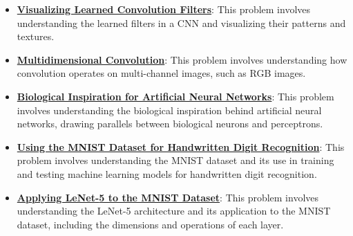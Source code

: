 \documentclass{article}%
\begin{document}
\begin{itemize}[leftmargin=*]
\item \href{https://purdue.brightspace.com/d2l/common/assets/pdfjs-d2l-dist/1.0.14-legacy/web/viewer.html?file=\%2Fcontent\%2Fenforced\%2F1095467-wl.202510.CS.24300.001\%2F09L1-cnn.pdf\%3Fou\%3D1095467\&lang=en-us\&container=d2l-fileviewer-rendered-pdf\&fullscreen=d2l-fileviewer-rendered-pdf-dialog\&height=667#page=18}{\textbf{Visualizing Learned Convolution Filters}}: This problem involves understanding the learned filters in a CNN and visualizing their patterns and textures.%
\item \href{https://purdue.brightspace.com/d2l/common/assets/pdfjs-d2l-dist/1.0.14-legacy/web/viewer.html?file=\%2Fcontent\%2Fenforced\%2F1095467-wl.202510.CS.24300.001\%2F09L1-cnn.pdf\%3Fou\%3D1095467\&lang=en-us\&container=d2l-fileviewer-rendered-pdf\&fullscreen=d2l-fileviewer-rendered-pdf-dialog\&height=667#page=19}{\textbf{Multidimensional Convolution}}: This problem involves understanding how convolution operates on multi-channel images, such as RGB images.%
\item \href{https://purdue.brightspace.com/d2l/common/assets/pdfjs-d2l-dist/1.0.14-legacy/web/viewer.html?file=\%2Fcontent\%2Fenforced\%2F1095467-wl.202510.CS.24300.001\%2F09L1-cnn.pdf\%3Fou\%3D1095467\&lang=en-us\&container=d2l-fileviewer-rendered-pdf\&fullscreen=d2l-fileviewer-rendered-pdf-dialog\&height=667#page=20}{\textbf{Biological Inspiration for Artificial Neural Networks}}: This problem involves understanding the biological inspiration behind artificial neural networks, drawing parallels between biological neurons and perceptrons.%
\item \href{https://purdue.brightspace.com/d2l/common/assets/pdfjs-d2l-dist/1.0.14-legacy/web/viewer.html?file=\%2Fcontent\%2Fenforced\%2F1095467-wl.202510.CS.24300.001\%2F09L1-cnn.pdf\%3Fou\%3D1095467\&lang=en-us\&container=d2l-fileviewer-rendered-pdf\&fullscreen=d2l-fileviewer-rendered-pdf-dialog\&height=667#page=21}{\textbf{Using the MNIST Dataset for Handwritten Digit Recognition}}: This problem involves understanding the MNIST dataset and its use in training and testing machine learning models for handwritten digit recognition.%
\item \href{https://purdue.brightspace.com/d2l/common/assets/pdfjs-d2l-dist/1.0.14-legacy/web/viewer.html?file=\%2Fcontent\%2Fenforced\%2F1095467-wl.202510.CS.24300.001\%2F09L1-cnn.pdf\%3Fou\%3D1095467\&lang=en-us\&container=d2l-fileviewer-rendered-pdf\&fullscreen=d2l-fileviewer-rendered-pdf-dialog\&height=667#page=22}{\textbf{Applying LeNet{-}5 to the MNIST Dataset}}: This problem involves understanding the LeNet-5 architecture and its application to the MNIST dataset, including the dimensions and operations of each layer.%

\end{itemize}
\end{document}
